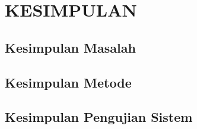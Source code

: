 \chapter{KESIMPULAN}

\section{Kesimpulan Masalah}

\section{Kesimpulan Metode}

\section{Kesimpulan Pengujian Sistem}
